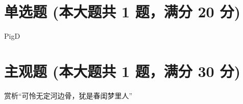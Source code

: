 \documentclass[12pt, a4paper, addpoints, answers]{exam}
\begin{document}
\hspace{5cm}

\section{\normalsize{单选题 (本大题共 1 题，满分 20 分)}}
\hspace{1.5cm}

\begin{questions}
\question[20] PigD

\begin{oneparchoices}
\end{oneparchoices}

\end{questions}

\hspace{5cm}

\section{\normalsize{主观题 (本大题共 1 题，满分 30 分)}}
\hspace{1.5cm}

\begin{questions}
\question[30] 赏析“可怜无定河边骨，犹是春闺梦里人”

\end{questions}
\end{document}
